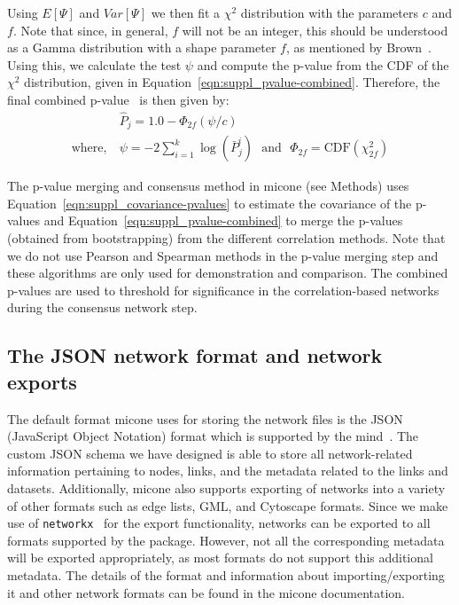 \documentclass[letterpaper,12pt]{article}
\begin{document}
  Using $E[\Psi]$ and $Var[\Psi]$ we then fit a $\chi^2$ distribution with the parameters $c$ and $f$.
  Note that since, in general, $f$ will not be an integer, this should be understood as a Gamma distribution with a shape parameter $f$, as mentioned by Brown~\cite{brown_400_1975}.
  Using this, we calculate the test $\psi$ and compute the p-value from the CDF of the $\chi^2$ distribution, given in Equation~\ref{eqn:suppl_pvalue-combined}.
  Therefore, the final combined p-value~\cite{Poole_Gibbs_Shmulevich_Bernard_Knijnenburg_2016} is then given by:
  \begin{equation}
    \begin{aligned*}
        & \hat{P}_j = 1.0 - \Phi_{2f}\left( \psi / c \right) \\
        \text{where},~ &\psi = -2 \sum_{i=1}^k \log(\bar{P}^i_j) ~~~\text{and}~~~ \Phi_{2f} = \mathrm{CDF}\left( \chi^2_{2f} \right)
    \end{aligned*}
    \label{eqn:suppl_pvalue-combined}
  \end{equation}

  The p-value merging and consensus method in \ac{micone} (see Methods) uses Equation~\ref{eqn:suppl_covariance-pvalues} to estimate the covariance of the p-values and Equation~\ref{eqn:suppl_pvalue-combined} to merge the p-values (obtained from bootstrapping) from the different correlation methods.
  Note that we do not use Pearson and Spearman methods in the p-value merging step and these algorithms are only used for demonstration and comparison.
  The combined p-values are used to threshold for significance in the correlation-based networks during the consensus network step.

  \subsection*{The JSON network format and network exports}

    The default format \ac{micone} uses for storing the network files is the JSON (JavaScript Object Notation) format which is supported by the \acf{mind}~\cite{huResourceComparisonIntegration2022}.
    The custom JSON schema we have designed is able to store all network-related information pertaining to nodes, links, and the metadata related to the links and datasets.
    Additionally, \ac{micone} also supports exporting of networks into a variety of other formats such as edge lists, GML, and Cytoscape formats.
    Since we make use of \texttt{networkx}~\cite{hagbergExploringNetworkStructure2008} for the export functionality, networks can be exported to all formats supported by the package.
    However, not all the corresponding metadata will be exported appropriately, as most formats do not support this additional metadata.
    The details of the format and information about importing/exporting it and other network formats can be found in the \ac{micone} documentation.
\end{document}
